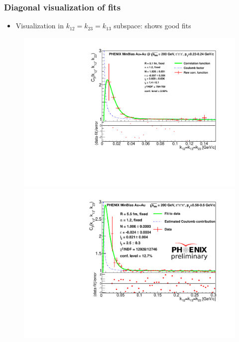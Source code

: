 \documentclass{beamer}
\begin{document}
\begin{frame}
\frametitle{Diagonal visualization of fits}
\begin{itemize}
\setlength{\itemsep}{16pt}
\item Visualization in $k_{12}=k_{23}=k_{13}$ subspace: shows good fits
\end{itemize}
\begin{figure}
\hspace*{-0.5cm}\includegraphics[scale=0.35]{pic/diag_lowpt.pdf}
 \hspace*{-0.6cm}\includegraphics[scale=0.35]{pic/diag_highpt.pdf}
\end{figure}
\end{frame}
\end{document}
